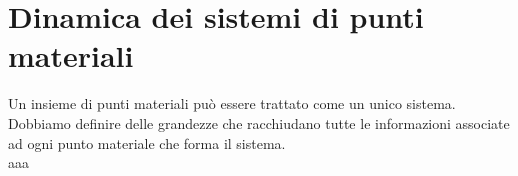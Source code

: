 \chapter{Dinamica dei sistemi di punti materiali}
Un insieme di punti materiali può essere trattato come un unico sistema.\\
Dobbiamo definire delle grandezze che racchiudano tutte le informazioni
associate ad ogni punto materiale che forma il sistema.\\
aaa